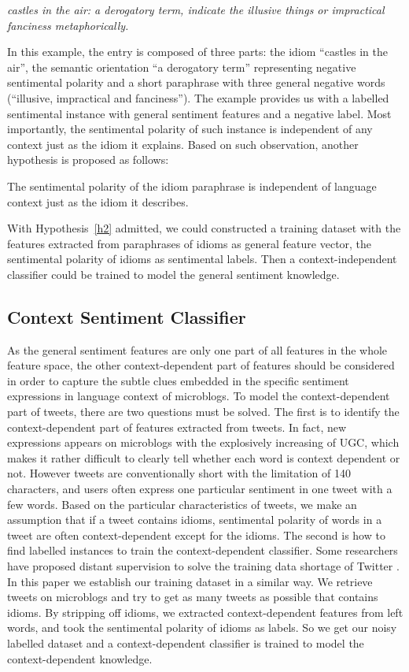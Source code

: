 \documentclass{llncs}
\begin{document}
\textit{castles in the air: a derogatory term, indicate the illusive things or impractical fanciness metaphorically.}

In this example, the entry is composed of three parts: the idiom ``castles in the air'', the semantic orientation ``a derogatory term'' representing negative
sentimental polarity and a short paraphrase with three general negative words (``illusive, impractical and fanciness''). 
The example provides us with a labelled sentimental instance with general sentiment features and a negative label.
Most importantly, the sentimental polarity of such instance is independent of any context just as the idiom it explains. 
Based on such observation, another hypothesis is proposed as follows:
\begin{hypothesis}
\label{h2}
The sentimental polarity of the idiom paraphrase is independent of language context just as the idiom it describes.
\end{hypothesis}
With Hypothesis~\ref{h2} admitted, we could constructed a training dataset with the features extracted from paraphrases of idioms as general feature vector, the sentimental polarity of idioms as sentimental labels. 
Then a context-independent classifier could be trained to model the general sentiment knowledge.

\subsection{Context Sentiment Classifier}
\label{context}

As the general sentiment features are only one part of all features in the whole feature space, the other context-dependent part of features should be considered in order to capture the subtle clues embedded in the specific sentiment expressions in language context of microblogs.
To model the context-dependent part of tweets, there are two questions must be solved. 
The first is to identify the context-dependent part of features extracted from tweets. 
In fact, new expressions appears on microblogs with the explosively increasing of UGC, which makes it rather difficult to clearly tell whether each word is context dependent or not. 
However tweets are conventionally short with the limitation of 140 characters, and users often express one particular sentiment in one tweet with a few words. 
Based on the particular characteristics of tweets, we make an assumption that if a tweet contains idioms,  sentimental polarity of words in a tweet are often context-dependent except for the idioms. 
The second is how to find labelled instances to train the context-dependent classifier. 
Some researchers have proposed distant supervision to solve the training data shortage of Twitter \cite{xsongx:b36,xsongx:b37}. 
In this paper we establish our training dataset in a similar way.
We retrieve tweets on microblogs and try to get as many tweets as possible that contains idioms. 
By stripping off idioms, we extracted context-dependent features from left words, and took the sentimental polarity of idioms as labels. 
So we get our noisy labelled dataset and a context-dependent classifier is trained to model the context-dependent knowledge.
\end{document}

